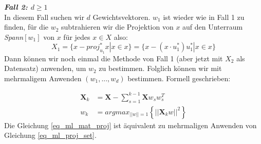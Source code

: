 \textbf{\textit{Fall 2: $d \geq 1$}}\\

In diesem Fall suchen wir $d$ Gewichtsvektoren. $w_1$ ist wieder wie in Fall 1 zu finden, für die $w_2$ subtrahieren wir die Projektion von $x$ auf den Unterraum \textit{Spann}{$[w_1]$} von $x$ für jedes $x \in X $ also:
\begin{equation}
    X_1 = \{x - proj_{u_1}^* x | x \in x\} = \{x - (x \cdot u_1^*)u_1^* | x \in x\}
    \label{eq_ml_proj_set}
\end{equation}
Dann können wir noch einmal die Methode von Fall 1 (aber jetzt mit $X_2$ als Datensatz) anwenden, um $w_2$ zu bestimmen. Folglich können wir mit mehrmaligem Anwenden $(w_1,...,w_d)$ bestimmen. Formell geschrieben:

\begin{align}
    \textbf{X}_k &= \textbf{X} - \sum_{s=1}^{k-1} \textbf{X}w_s w_s^T\\ \label{eq_ml_mat_proj}
    w_k &=  argmax_{||w|| = 1} \left\{||\textbf{X}_k w||^2\right\}
\end{align}
Die Gleichung \ref{eq_ml_mat_proj} ist äquivalent zu mehrmaligen Anwenden von Gleichung \ref{eq_ml_proj_set}.

